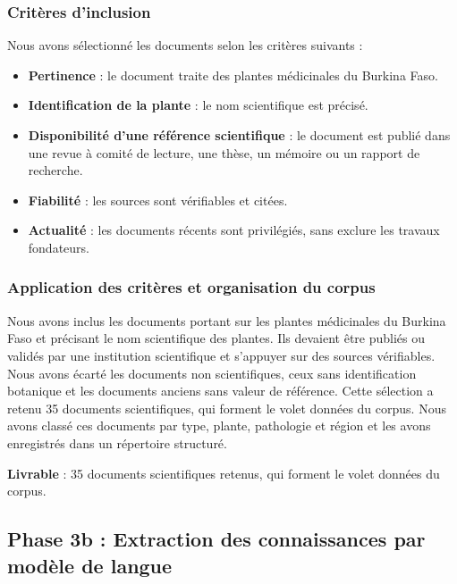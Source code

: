 \subsubsection{Critères d'inclusion}

Nous avons sélectionné les documents selon les critères suivants :

\begin{itemize}
\item \textbf{Pertinence} : le document traite des plantes médicinales du Burkina Faso.
\item \textbf{Identification de la plante} : le nom scientifique est précisé.
\item \textbf{Disponibilité d'une référence scientifique} : le document est publié dans une revue à comité de lecture, une thèse, un mémoire ou un rapport de recherche.
\item \textbf{Fiabilité} : les sources sont vérifiables et citées.
\item \textbf{Actualité} : les documents récents sont privilégiés, sans exclure les travaux fondateurs.
\end{itemize}

\subsubsection{Application des critères et organisation du corpus}

Nous avons inclus les documents portant sur les plantes médicinales du Burkina Faso et précisant le nom scientifique des plantes. Ils devaient être publiés ou validés par une institution scientifique et s'appuyer sur des sources vérifiables. Nous avons écarté les documents non scientifiques, ceux sans identification botanique et les documents anciens sans valeur de référence. Cette sélection a retenu 35 documents scientifiques, qui forment le volet données du corpus. Nous avons classé ces documents par type, plante, pathologie et région et les avons enregistrés dans un répertoire structuré.

\textbf{Livrable} : 35 documents scientifiques retenus, qui forment le volet données du corpus.


\subsection{Phase 3b : Extraction des connaissances par modèle de langue}
\label{subsec:phase3b}

